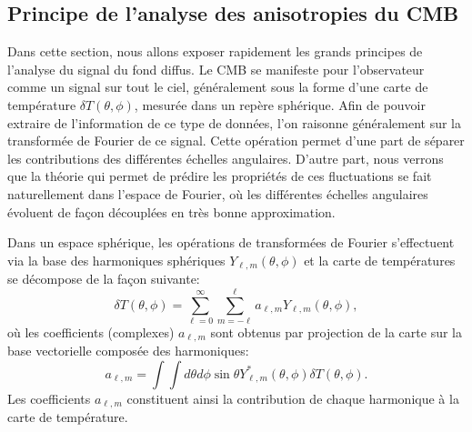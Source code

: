 \subsection{Principe de l'analyse des anisotropies du CMB}
Dans cette section, nous allons exposer rapidement les grands principes de l'analyse du signal du fond diffus. Le CMB se manifeste pour l'observateur comme un signal sur tout le ciel, généralement sous la forme d'une carte de température $\delta T(\theta,\phi)$, mesurée dans un repère sphérique. Afin de pouvoir extraire de l'information de ce type de données, l'on raisonne généralement sur la transformée de Fourier de ce signal. Cette opération permet d'une part de séparer les contributions des différentes échelles angulaires. D'autre part, nous verrons que la théorie qui permet de prédire les propriétés de ces fluctuations se fait naturellement dans l'espace de Fourier, où les différentes échelles angulaires évoluent de façon découplées en très bonne approximation.  

Dans un espace sphérique, les opérations de transformées de Fourier s'effectuent via la base des harmoniques sphériques $Y_{\ell,m}(\theta,\phi)$ et la carte de températures se décompose de la façon suivante:
\begin{equation}
\delta T(\theta,\phi)= \sum_{\ell=0}^{\infty}\sum_{m=-\ell}^{\ell} a_{\ell,m} Y_{\ell,m}(\theta,\phi),
\end{equation}
où les coefficients (complexes) $a_{\ell,m}$ sont obtenus par projection de la carte sur la base vectorielle composée des harmoniques:
\begin{equation}
a_{\ell,m}=\int \int d\theta d\phi\sin \theta Y^*_{\ell,m}(\theta,\phi) \delta T(\theta,\phi).
\end{equation}
Les coefficients $a_{\ell,m}$ constituent ainsi la contribution de chaque harmonique à la carte de température.

